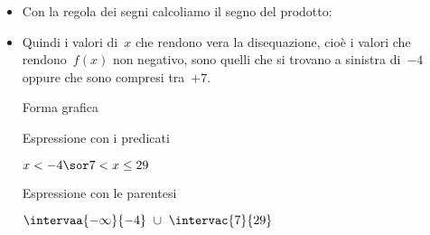 \begin{esempio}
\begin{itemize}
\begin{itemize}
\end{itemize}
 \item Con la regola dei segni calcoliamo il segno del prodotto:
\begin{inaccessibleblock}
  \begin{center}
  \segnofrazionea
  \end{center}
\end{inaccessibleblock}
 \item
 Quindi i valori di~\(x\) che rendono vera la disequazione, cioè
i valori  che rendono~\(f(x)\) non negativo, sono quelli
  che si trovano a sinistra di~\(-4\) oppure che sono compresi
  tra~\(+7\).\\

  \begin{minipage}{.32\textwidth}
  \vspace{.7em}
  Forma grafica\\ [-.8em]

\begin{inaccessibleblock}
  \begin{center}
  \solfrazionea
  \end{center}
\end{inaccessibleblock}
\vspace{.1em}

  \end{minipage}
  \begin{minipage}{.32\textwidth}
  Espressione con i predicati\\[-.3em]

 \begin{center}
  \(x < -4 \sor 7 < x \le 29\)
  \vspace{1em}
 \end{center}
  \end{minipage}
  \begin{minipage}{.32\textwidth}
  Espressione con le parentesi\\[-.3em]

 \begin{center}
  \(\intervaa{-\infty}{-4}~\cup~\intervac{7}{29}\)
  \vspace{.8em}
 \end{center}
  \end{minipage}

\end{itemize}

\end{esempio}

